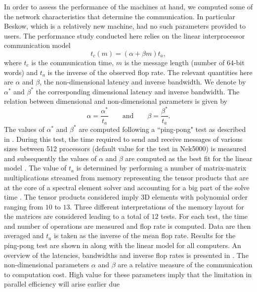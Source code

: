 \documentclass{sig-alternate}
\begin{document}
In order to assess the performance of the machines at hand, we computed  some of the network characteristics that determine the communication. In particular Beskow, which is a relatively new machine, had no such parameters provided to users. 
The performance study conducted here relies on the linear interprocessor communication  model
\begin{equation}
 t_c(m) = (\alpha + \beta m) t_a,\label{eqn:lincomm}
\end{equation}
where $t_c$ is the communication time, $m$ is the message length (number of
64-bit words) and $t_a$ is the inverse of the observed flop rate. The relevant
quantities here are $\alpha$ and $\beta$, the non-dimensional latency and inverse
 bandwidth. We denote by $\alpha^*$ and $\beta^*$ the corresponding dimensional 
latency and inverse bandwidth. The relation between dimensional and non-dimensional parameters is given by
\begin{equation*}
\alpha = \frac{\alpha^*}{t_a} \qquad \text{and} \qquad \beta = \frac{\beta^*}{t_a}.
\end{equation*}
The values of $\alpha^*$ and $\beta^*$ are computed following a ``ping-pong" test 
as described in \cite{fischer:scaling}. During this test, the time required to 
send and receive messages of various sizes between 512 processors (default value
for the test in Nek5000) is measured 
and subsequently the values of $\alpha$ and $\beta$ are computed as the best fit 
for the linear model . The value of $t_a$ is determined by 
performing a number of matrix-matrix multiplications streamed from memory
representing the tensor products that are at the core of a spectral element 
solver \cite{fischer:hom} and accounting for a big part of the solve time 
\cite{Max2016}. The tensor products considered imply 3D elements with polynomial 
order ranging from $10$ to $13$. Three different interpretations of the memory 
layout for the matrices are considered 
leading to a total of $12$ tests. For each test, the time and number of operations are
measured and flop rate is computed. Data are then averaged and $t_a$ is taken as the
inverse of the mean flop rate. Results for the ping-pong test are shown in 
 along with the linear model for all computers. An overview 
of the latencies, bandwidths and inverse flop rates is presented in 
. The non-dimensional parameters $\alpha$ and $\beta$ are 
a relative measure of the communication to computation cost. High value for these
parameters imply that the limitation in parallel efficiency will arise earlier due 
\end{document}
